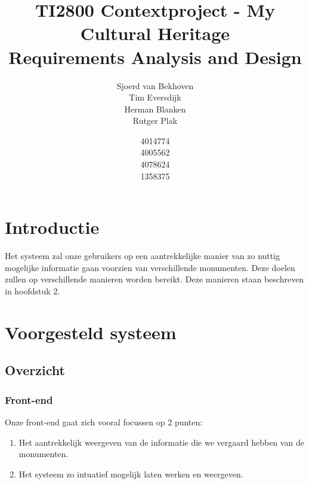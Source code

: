 \documentclass[a4paper,10pt]{article}
\begin{document}
\title{TI2800 Contextproject - My Cultural Heritage \\ Requirements Analysis and Design}
\author{Sjoerd van Bekhoven\\ Tim Eversdijk \\ Herman Blanken \\ Rutger Plak \and 4014774 \\ 4005562 \\ 4078624 \\ 1358375}
\maketitle
\clearpage

\tableofcontents

\clearpage
\section{Introductie}
Het systeem zal onze gebruikers op een aantrekkelijke manier van zo nuttig mogelijke informatie gaan voorzien van verschillende monumenten. Deze doelen zullen op verschillende manieren worden bereikt. Deze manieren staan beschreven in hoofdstuk 2.

\clearpage
\section{Voorgesteld systeem}
	\subsection{Overzicht}
		\subsubsection{Front-end}
			Onze front-end gaat zich vooral focussen op 2 punten:
			\begin{enumerate}
				\item Het aantrekkelijk weergeven van de informatie die we vergaard hebben van de monumenten.
				\item Het systeem zo intuatief mogelijk laten werken en weergeven.
			\end{enumerate}
				
\end{document}
